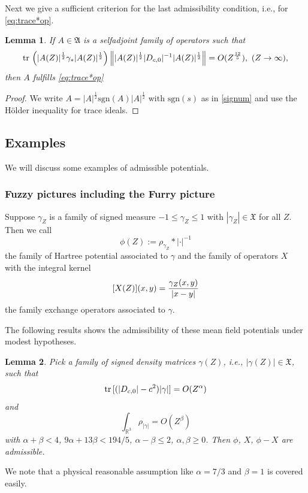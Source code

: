 \documentclass[a4paper]{amsart}
\newtheorem{lemma}{Lemma}
\def\tr{{\rm tr \,}}
\def\gA{\mathfrak{A}}
\def\gX{\mathfrak{X}}
\def\rz{\mathbb{R}} %
\def\sgn{\mathrm{sgn}} %
\begin{document}
Next we give a sufficient criterion for the last admissibility
condition, i.e., for \eqref{eq:trace*op}.
\begin{lemma}
  \label{sufficient}
  If $A\in\gA$ is a selfadjoint family of operators such that
  \begin{equation}
    \label{eq:sufficient}
    \tr\left(|A(Z)|^\frac12\gamma_*|A(Z)|^\frac12\right)\left\||A(Z)|^\frac12|D_{c,0}|^{-1}|A(Z)|^\frac12\right\|=O(Z^\frac{12}5),\ (Z\to\infty),
  \end{equation}
  then $A$ fulfills \eqref{eq:trace*op}
\end{lemma}
\begin{proof}
  We write $A=|A|^\frac12 \sgn(A) |A|^\frac12$ with $\sgn(s)$ as in
  \eqref{signum} and use the H\"older inequality for trace ideals.
\end{proof}




        
  \subsection{Examples}
  \label{examples}
We will discuss some examples of admissible potentials.
\subsubsection{Fuzzy pictures including the Furry
  picture}\label{ex:Fuzzy}

Suppose $\gamma_Z$ is a family of signed measure $-1\leq \gamma_Z\leq1$  with $|\gamma_Z|\in\gX$ for all $Z$. Then we call 
\begin{equation}
  \label{hart}
  \phi(Z):= \rho_{\gamma_Z}*|\cdot|^{-1}
\end{equation}
the family of Hartree potential associated to $\gamma$ and the family
of operators $X$ with the integral kernel
  \begin{equation}
  \label{ex}
  [X(Z)](x,y)={\gamma_Z(x,y)\over|x-y|}
\end{equation}
the family exchange operators associated to $\gamma$. 

The following results shows the admissibility of these mean field
potentials under modest hypotheses.
\begin{lemma}
  \label{lem:Hartree-Exchange}
  Pick a family of signed density matrices $\gamma(Z)$, i.e.,
  $|\gamma(Z)|\in\gX$,
such that
  \begin{equation}
    \label{eq:inf}
    \tr [(|D_{c,0}|-c^2)|\gamma| ]= O(Z^\alpha)
  \end{equation}
  and 
  \begin{equation}
    \int_{\rz^3}\rho_{|\gamma|}= O (Z^\beta)
  \end{equation}
  with $\alpha+\beta<4$, $9\alpha+13\beta< 194/5$, $\alpha-\beta\leq2$,
  $\alpha,\beta\geq0$. 
  Then $\phi$, $X$, $\phi-X$ are admissible. 
\end{lemma}
We note that a physical reasonable assumption like $\alpha=7/3$ and
$\beta=1$ is covered easily.
\end{document}
